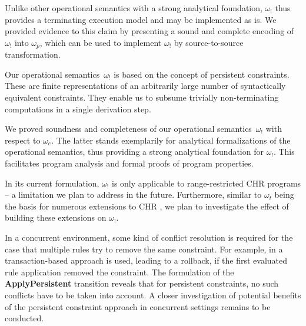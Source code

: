 \documentclass{tlp}
\newcommand{\bang}{\ensuremath{!}}
\newcommand{\obang}{\ensuremath{{\omega_\bang}}}
\begin{document}
Unlike other operational semantics with a strong analytical foundation, $\obang$
thus provides a terminating execution model and may be implemented as is. We
provided evidence to this claim by presenting a sound and complete encoding of
$\obang$ into $\omega_p$, which can be used to implement $\obang$ by
source-to-source transformation.

Our operational semantics~$\obang$ is based on the concept of persistent
constraints. These are finite representations of an arbitrarily large number of
syntactically equivalent constraints. They enable us to subsume trivially
non-terminating computations in a single derivation step.

We proved soundness and completeness of our operational semantics~$\obang$ with
respect to $\omega_e$. The latter stands exemplarily for analytical
formalizations of the operational semantics, thus providing a strong analytical
foundation for $\obang$. This facilitates program analysis and formal proofs of
program properties.

In its current formulation, $\obang$ is only applicable to range-restricted CHR
programs -- a limitation we plan to address in the future. Furthermore, similar
to $\omega_t$ being the basis for numerous extensions to CHR
\cite{chr_survey_tplp08}, we plan to investigate the effect of building these
extensions on $\obang$.

In a concurrent environment, some kind of conflict resolution is required for the
case that multiple rules try to remove the same constraint. For example, in
\cite{Sulzmann2008} a transaction-based approach is used, leading to a rollback,
if the first evaluated rule application removed the constraint. The formulation
of the \textbf{ApplyPersistent} transition reveals that for persistent
constraints, no such conflicts have to be taken into account. A closer
investigation of potential benefits of the persistent constraint approach in
concurrent settings remains to be conducted.


\end{document}

